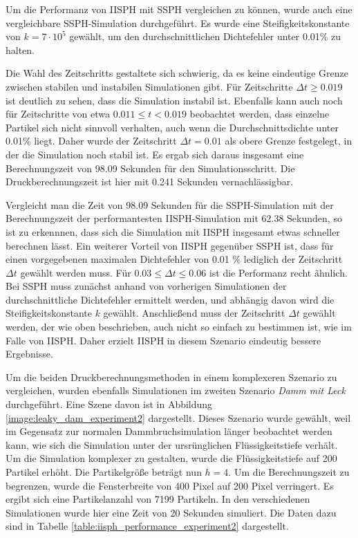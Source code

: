 \documentclass[11pt,
a4paper,
parskip=half, %
BCOR=10mm, %
english,
ngerman]{scrreprt}
\begin{document}
Um die Performanz von IISPH mit SSPH vergleichen zu können, wurde auch eine vergleichbare SSPH-Simulation durchgeführt.
Es wurde eine Steifigkeitskonstante von $k = 7 \cdot 10^5$ gewählt, um den durchschnittlichen Dichtefehler unter 0.01\% zu halten.

Die Wahl des Zeitschritts gestaltete sich schwierig, da es keine eindeutige Grenze zwischen stabilen und instabilen Simulationen gibt.
Für Zeitschritte $\Delta t \geq 0.019$ ist deutlich zu sehen, dass die Simulation instabil ist.
Ebenfalls kann auch noch für Zeitschritte von etwa $0.011 \leq t < 0.019$ beobachtet werden, dass einzelne Partikel sich nicht sinnvoll verhalten,
auch wenn die Durchschnittsdichte unter 0.01\% liegt.
Daher wurde der Zeitschritt $\Delta t = 0.01$ als obere Grenze festgelegt, in der die Simulation noch stabil ist.
Es ergab sich daraus insgesamt eine Berechnungszeit von 98.09 Sekunden für den Simulationsschritt.
Die Druckberechnungszeit ist hier mit 0.241 Sekunden vernachlässigbar.

Vergleicht man die Zeit von 98.09 Sekunden für die SSPH-Simulation mit der Berechnungszeit der performantesten IISPH-Simulation mit 62.38 Sekunden,
so ist zu erkennnen, dass sich die Simulation mit IISPH insgesamt etwas schneller berechnen lässt.
Ein weiterer Vorteil von IISPH gegenüber SSPH ist,
dass für einen vorgegebenen maximalen Dichtefehler von 0.01 \% lediglich der Zeitschritt $\Delta t$ gewählt werden muss.
Für $0.03 \leq \Delta t \leq 0.06$ ist die Performanz recht ähnlich.
Bei SSPH muss zunächst anhand von vorherigen Simulationen der durchschnittliche Dichtefehler ermittelt werden,
und abhängig davon wird die Steifigkeitskonstante $k$ gewählt.
Anschließend muss der Zeitschritt $\Delta t$ gewählt werden, der wie oben beschrieben, auch nicht so einfach zu bestimmen ist, wie im Falle von IISPH.
Daher erzielt IISPH in diesem Szenario eindeutig bessere Ergebnisse.


Um die beiden Druckberechnungsmethoden in einem komplexeren Szenario zu vergleichen,
wurden ebenfalls Simulationen im zweiten Szenario \textit{Damm mit Leck} durchgeführt.
Eine Szene davon ist in Abbildung \ref{image:leaky_dam_experiment2} dargestellt.
Dieses Szenario wurde gewählt, weil im Gegensatz zur normalen Dammbruchsimulation länger beobachtet werden kann,
wie sich die Simulation unter der ursrünglichen Flüssigkeitstiefe verhält.
Um die Simulation komplexer zu gestalten, wurde die Flüssigkeitstiefe auf 200 Partikel erhöht.
Die Partikelgröße beträgt nun $h = 4$.
Um die Berechnungszeit zu begrenzen, wurde die Fensterbreite von 400 Pixel auf 200 Pixel verringert.
Es ergibt sich eine Partikelanzahl von 7199 Partikeln.
In den verschiedenen Simulationen wurde hier eine Zeit von 20 Sekunden simuliert.
Die Daten dazu sind in Tabelle \ref{table:iisph_performance_experiment2} dargestellt.
\end{document}
